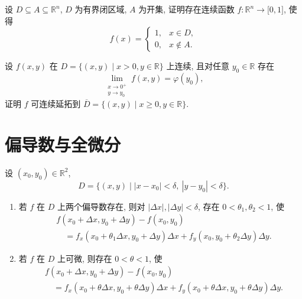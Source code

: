 \documentclass[../../数学分析培优讲义.tex]{subfiles}
\begin{document}
\begin{example}
设 $D\subseteq A\subseteq\mathbb{R}^n$, $D$ 为有界闭区域, $A$ 为开集, 证明存在连续函数 $f:\mathbb{R}^n\to\lbrack0,1\rbrack$, 使得
\[
    f(x)=
    \begin{cases}
        1, & x\in D,\\
        0, & x\notin A.
    \end{cases}
\]
\end{example}
\exampleblank

\begin{example}
设 $f(x,y)$ 在 $D=\{(x,y)\mid x>0,y\in\mathbb{R}\}$ 上连续, 且对任意 $y_0\in\mathbb{R}$ 存在
\[
    \lim\limits_{\substack{x\to0^+\\y\to y_0}}f(x,y)=\varphi(y_0),
\]
证明 $f$ 可连续延拓到 $\overline D=\{(x,y)\mid x\geq0,y\in\mathbb{R}\}$.
\end{example}
\exampleblank


\newpage

\section{偏导数与全微分}

\begin{theorem}
设 $(x_0,y_0)\in\mathbb{R}^2$,
\[
    D=\{(x,y)\mid |x-x_0|<\delta,\ |y-y_0|<\delta\}.
\]
\begin{enumerate}[label=(\arabic*)]
    \item 若 $f$ 在 $D$ 上两个偏导数存在, 则对 $|\Delta x|,|\Delta y|<\delta$, 存在 $0<\theta_1,\theta_2<1$, 使
    \[
    \begin{aligned}
        &f(x_0+\Delta x,y_0+\Delta y)-f(x_0,y_0)\\
        &\quad=f_x(x_0+\theta_1\Delta x,y_0+\Delta y)\Delta x
        +f_y(x_0,y_0+\theta_2\Delta y)\Delta y.
    \end{aligned}
    \]
    \item 若 $f$ 在 $D$ 上可微, 则存在 $0<\theta<1$, 使
    \[
    \begin{aligned}
        &f(x_0+\Delta x,y_0+\Delta y)-f(x_0,y_0)\\
        &\quad=f_x(x_0+\theta\Delta x,y_0+\theta\Delta y)\Delta x
        +f_y(x_0+\theta\Delta x,y_0+\theta\Delta y)\Delta y.
    \end{aligned}
    \]
\end{enumerate}
\end{theorem}
\end{document}
